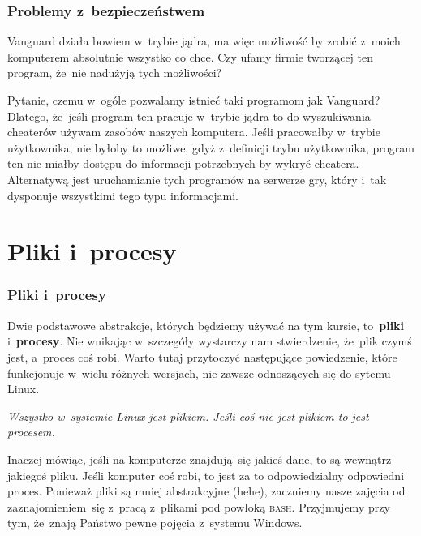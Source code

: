 \documentclass[10pt,t]{beamer}
\begin{document}
\begin{frame}
  \frametitle{Problemy z~bezpieczeństwem}


  Vanguard działa bowiem w~trybie jądra, ma więc możliwość by zrobić
  z~moich komputerem absolutnie wszystko co chce. Czy ufamy firmie
  tworzącej ten program, że~nie nadużyją tych możliwości?

  Pytanie, czemu w~ogóle pozwalamy istnieć taki programom jak Vanguard?
  Dlatego, że~jeśli program ten pracuje w~trybie jądra to do wyszukiwania
  cheaterów używam zasobów \alert{naszych} komputera. Jeśli pracowałby
  w~trybie użytkownika, nie byłoby to możliwe, gdyż z~definicji trybu
  użytkownika, program ten nie miałby dostępu do informacji potrzebnych by
  wykryć cheatera. Alternatywą jest uruchamianie tych programów na serwerze
  gry, który i~tak dysponuje wszystkimi tego typu informacjami.

\end{frame}










\section{Pliki i~procesy}



\begin{frame}
  \frametitle{Pliki i~procesy}


  Dwie podstawowe abstrakcje, których będziemy używać na tym kursie,
  to~\textbf{pliki} i~\textbf{procesy}. Nie wnikając w~szczegóły wystarczy
  nam stwierdzenie, że~plik czymś jest, a~proces coś robi. Warto tutaj
  przytoczyć następujące powiedzenie, które funkcjonuje w~wielu różnych
  wersjach, nie zawsze odnoszących się do sytemu Linux.

  \textit{Wszystko w~systemie Linux jest plikiem. Jeśli coś nie jest
    plikiem to jest procesem.}

  Inaczej mówiąc, jeśli na komputerze znajdują~się jakieś dane, to są
  wewnątrz jakiegoś pliku. Jeśli komputer coś robi, to jest za to
  odpowiedzialny odpowiedni proces. Ponieważ pliki są mniej abstrakcyjne
  (hehe), zaczniemy nasze zajęcia od zaznajomieniem~się z~pracą z~plikami
  pod powłoką \textsc{bash}. Przyjmujemy przy tym, że~znają Państwo pewne
  pojęcia z~systemu Windows.

\end{frame}
\end{document}

